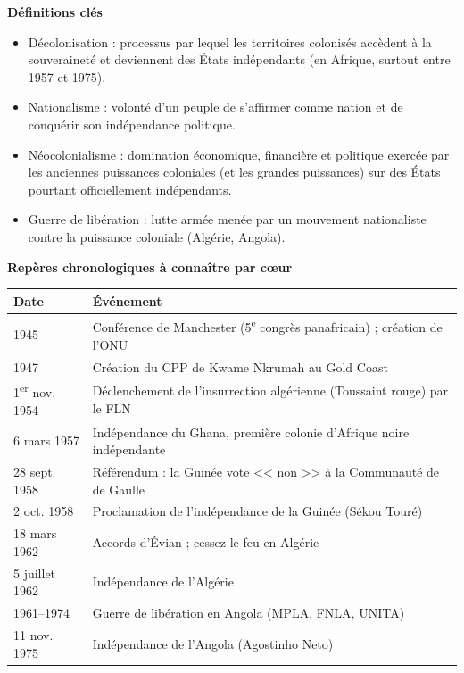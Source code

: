 \documentclass[11pt]{article}
\newcommand{\cle}[1]{{\popxbold\color{popdark}#1}}
\begin{document}
\begin{bilan}
\textbf{Définitions clés}
\begin{itemize}
\item \cle{Décolonisation} : processus par lequel les territoires colonisés accèdent à la souveraineté et deviennent des États indépendants (en Afrique, surtout entre 1957 et 1975).
\item \cle{Nationalisme} : volonté d'un peuple de s'affirmer comme nation et de conquérir son indépendance politique.
\item \cle{Néocolonialisme} : domination économique, financière et politique exercée par les anciennes puissances coloniales (et les grandes puissances) sur des États pourtant officiellement indépendants.
\item \cle{Guerre de libération} : lutte armée menée par un mouvement nationaliste contre la puissance coloniale (Algérie, Angola).
\end{itemize}

\textbf{Repères chronologiques à connaître par c\oe ur}
\begin{center}
\begin{tabularx}{\linewidth}{|l|X|}\hline
\rowcolor{popblueL} \textbf{Date} & \textbf{Événement} \\ \hline
1945 & Conférence de Manchester (5\textsuperscript{e} congrès panafricain) ; création de l'ONU \\ \hline
1947 & Création du CPP de Kwame Nkrumah au Gold Coast \\ \hline
1\textsuperscript{er} nov. 1954 & Déclenchement de l'insurrection algérienne (Toussaint rouge) par le FLN \\ \hline
6 mars 1957 & Indépendance du Ghana, première colonie d'Afrique noire indépendante \\ \hline
28 sept. 1958 & Référendum : la Guinée vote << non >> à la Communauté de de Gaulle \\ \hline
2 oct. 1958 & Proclamation de l'indépendance de la Guinée (Sékou Touré) \\ \hline
18 mars 1962 & Accords d'Évian ; cessez-le-feu en Algérie \\ \hline
5 juillet 1962 & Indépendance de l'Algérie \\ \hline
1961--1974 & Guerre de libération en Angola (MPLA, FNLA, UNITA) \\ \hline
11 nov. 1975 & Indépendance de l'Angola (Agostinho Neto) \\ \hline
\end{tabularx}
\end{center}


\end{bilan}
\end{document}
